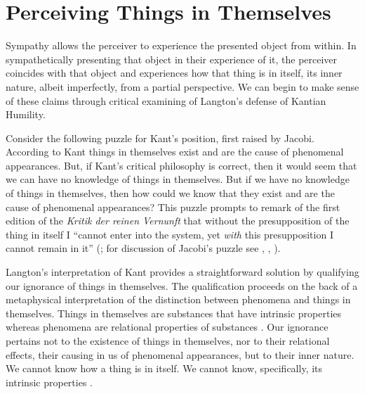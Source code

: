 
%
%

\section{Perceiving Things in Themselves} %
\label{sec:perceiving_things_in_themselves}

Sympathy allows the perceiver to experience the presented object from within. In sympathetically presenting that object in their experience of it, the perceiver coincides with that object and experiences how that thing is in itself, its inner nature, albeit imperfectly, from a partial perspective. We can begin to make sense of these claims through critical examining of Langton's \citeyearpar{Langton:1998aa} defense of Kantian Humility.

Consider the following puzzle for Kant's position, first raised by Jacobi. According to Kant things in themselves exist and are the cause of phenomenal appearances. But, if Kant's critical philosophy is correct, then it would seem that we can have no knowledge of things in themselves. But if we have no knowledge of things in themselves, then how could we know that they exist and are the cause of phenomenal appearances? This puzzle prompts \citet[304]{Jacobi:1815bs} to remark of the first edition of the \emph{Kritik der reinen Vernunft} that without the presupposition of the thing in itself I ``cannot enter into the system, yet \emph{with} this presupposition I cannot remain in it'' (\citealt[335]{Guyer:1987xe}; for discussion of Jacobi's puzzle see \citealt[247--54]{Allison:1983ly}, \citealt[chapter 15]{Guyer:1987xe}, \citealt[chapter 1]{Langton:1998aa}).

Langton's interpretation of Kant provides a straightforward solution by qualifying our ignorance of things in themselves. The qualification proceeds on the back of a metaphysical interpretation of the distinction between phenomena and things in themselves. Things in themselves are substances that have intrinsic properties whereas phenomena are relational properties of substances \citep[20]{Langton:1998aa}. Our ignorance pertains not to the existence of things in themselves, nor to their relational effects, their causing in us of phenomenal appearances, but to their inner nature. We cannot know how a thing is in itself. We cannot know, specifically, its intrinsic properties \citep[13]{Langton:1998aa}. 



